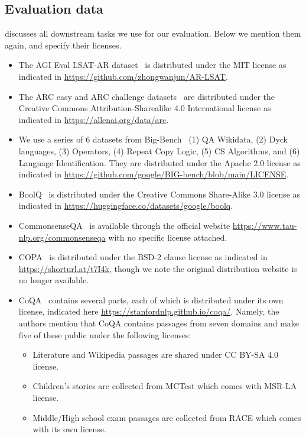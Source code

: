 \documentclass{article}
\begin{document}
\subsection{Evaluation data}
 discusses all downstream tasks we use for our evaluation.
Below we mention them again, and specify their licenses.
\begin{itemize}
    \item
    The AGI Eval LSAT-AR dataset~\citep{zhong2023agieval} is distributed under the MIT license as indicated in \url{https://github.com/zhongwanjun/AR-LSAT}.
    \item
    The ARC easy and ARC challenge datasets~\citep{arc} are distributed under the Creative Commons Attribution-Sharealike 4.0 International license as indicated in \url{https://allenai.org/data/arc}.
    \item
    We use a series of 6 datasets from Big-Bench~\citep{srivastava2023beyond} (1) QA Wikidata, (2) Dyck languages, (3) Operators, (4) Repeat Copy Logic, (5) CS Algorithms, and (6) Language Identification. They are distributed under the Apache 2.0 license as indicated in \url{https://github.com/google/BIG-bench/blob/main/LICENSE}.
    \item
    BoolQ~\citep{boolq} is distributed under the  Creative Commons Share-Alike 3.0 license as indicated in \url{https://huggingface.co/datasets/google/boolq}.
    \item
    CommonsenseQA~\citep{talmor-etal-2019-commonsenseqa}  is available through the official website \url{https://www.tau-nlp.org/commonsenseqa} with no specific license attached.
    \item
    COPA~\citep{copa} is distributed under the BSD-2 clause license as indicated in \url{https://shorturl.at/t7I4k}, though we note the original distribution website is no longer available.
    \item
    CoQA~\citep{reddy-etal-2019-coqa} contains several parts, each of which is distributed under its own license, indicated here \url{https://stanfordnlp.github.io/coqa/}. Namely, the authors mention that CoQA contains passages from seven domains and make five of these public under the following licenses:
        \begin{itemize}
        \item Literature and Wikipedia passages are shared under CC BY-SA 4.0 license.
        \item Children's stories are collected from MCTest which comes with MSR-LA license.
        \item Middle/High school exam passages are collected from RACE which comes with its own license.

\end{itemize}
\end{itemize}
\end{document}
